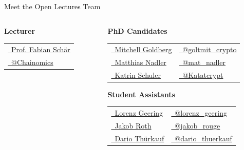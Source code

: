 \documentclass[handout]{beamer}
\begin{document}
\begin{frame}{Meet the Open Lectures Team}
	\begin{columns}[T]
		\begin{column}{0.3\textwidth}
			\center \hspace{-0.5cm}\textbf{Lecturer}
			\begin{table}\small
				\begin{tabular}{F}
					\href{https://linkedin.com/in/fabian-schaer/}{\faLinkedinSquare\ Prof. Fabian Schär}\\
					\href{https://twitter.com/chainomics}{\faTwitterSquare\ @Chainomics}\\
				\end{tabular}
			\end{table}
		\end{column}
		\begin{column}{0.7\textwidth}
			\center \hspace{-0.5cm}\textbf{PhD Candidates}
			\begin{table}\small
				\newcolumntype{F}{>{\raggedright\arraybackslash}p{3.5cm}}
				\begin{tabular}{FF}
					\href{https://linkedin.com/in/mitchell-goldberg/}{\faLinkedinSquare\ Mitchell Goldberg} & \href{https://twitter.com/golmit_crypto}{\faTwitterSquare\ @goltmit\_crypto}\\
					\href{https://linkedin.com/in/mat-nadler/}{\faLinkedinSquare\ Matthias Nadler} & \href{https://twitter.com/mat_nadler}{\faTwitterSquare\ @mat\_nadler}\\
					\href{https://linkedin.com/in/kmschuler/}{\faLinkedinSquare\ Katrin Schuler} & \href{https://twitter.com/Katatcrypt}{\faTwitterSquare\ @Katatcrypt}\\
				\end{tabular}
			\end{table}
			\center \hspace{-0.5cm}\textbf{Student Assistants}
			\begin{table}\small
				\newcolumntype{F}{>{\raggedright\arraybackslash}p{3.5cm}}
				\begin{tabular}{FF}
					\href{https://linkedin.com/in/lorenz-geering-770359a8/}{\faLinkedinSquare\ Lorenz Geering} & \href{https://twitter.com/lorenz_geering}{\faTwitterSquare\ @lorenz\_geering}\\
					\href{https://linkedin.com/in/jakob-roth}{\faLinkedinSquare\ Jakob Roth} & \href{https://twitter.com/jakob_rouge}{\faTwitterSquare\ @jakob\_rouge}\\
					\href{https://linkedin.com/in/dario-thuerkauf/}{\faLinkedinSquare\ Dario Thürkauf} & \href{https://twitter.com/dario_thuerkauf}{\faTwitterSquare\ @dario\_thuerkauf}\\
				\end{tabular}
			\end{table}
		\end{column}
	\end{columns}
\end{frame}
\end{document}
